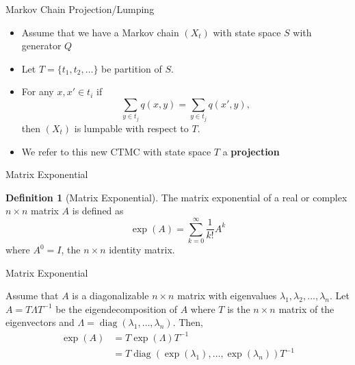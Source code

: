 \documentclass{beamer}
\theoremstyle{definition}
\newtheorem{defn}[theorem]{Definition}
\begin{document}
\begin{frame}{Markov Chain Projection/Lumping}
\begin{itemize}
    \item Assume that we have a Markov chain $(X_t)$ with state space $S$ with generator $Q$
    \item Let $T = \{t_1, t_2, \ldots\}$ be partition of $S$.
    \item For any $x,x' \in t_i$ if
    $$
    {\displaystyle \sum _{y \in t_{j}}q(x,y)=\sum _{y \in t_{j}}q(x',y),}
    $$
    then $(X_t)$ is lumpable with respect to $T$.
    \item We refer to this new CTMC with state space $T$ a \textbf{projection}
\end{itemize}


\end{frame}

\begin{frame}{Matrix Exponential}
    
\begin{defn}[Matrix Exponential]
The matrix exponential of a real or complex $n \times n$ matrix $A$ is defined as
$$
\exp(A) = \sum_{k = 0}^\infty \frac{1}{k!} A^k
$$
where $A^0 = I$, the $n \times n$ identity matrix.
\end{defn}
\end{frame}


\begin{frame}{Matrix Exponential}
\begin{theorem} \label{thm:eigen_matrix_exp}
Assume that $A$ is a diagonalizable $n \times n$ matrix with eigenvalues $\lambda_1, \lambda_2, \ldots, \lambda_n$.
Let $A = T \Lambda T^{-1}$ be the eigendecomposition of $A$ where $T$ is the $n \times n$ matrix of the eigenvectors and $\Lambda = \operatorname{diag}(\lambda_1, \ldots, \lambda_n)$.
Then,
\begin{align*}
    \exp(A) &= T \exp(\Lambda) T^{-1}\\
    &= T \operatorname{diag}(\exp(\lambda_1), \ldots, \exp(\lambda_n)) T^{-1}
\end{align*}
\end{theorem}
\end{frame}
\end{document}
